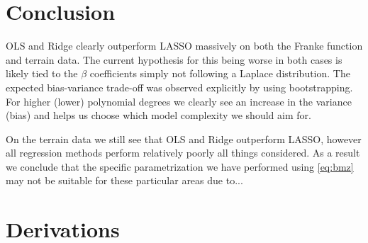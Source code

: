 \documentclass[%
reprint,
amsmath,amssymb,
aps,
pra,
]{revtex4-2}
\begin{document}
\section{Conclusion}
OLS and Ridge clearly outperform LASSO massively on both the Franke function and terrain data. The current hypothesis for this being worse in both cases is likely tied to the $\beta$ coefficients simply not following a Laplace distribution. The expected bias-variance trade-off was observed explicitly by using bootstrapping. For higher (lower) polynomial degrees we clearly see an increase in the variance (bias) and helps us choose which model complexity we should aim for. 

On the terrain data we still see that OLS and Ridge outperform LASSO, however all regression methods perform relatively poorly all things considered. As a result we conclude that the specific parametrization we have performed using \eqref{eq:bmz} may not be suitable for these particular areas due to...






\appendix
\section{Derivations}
\label{Appendix:Derivations}
\end{document}
